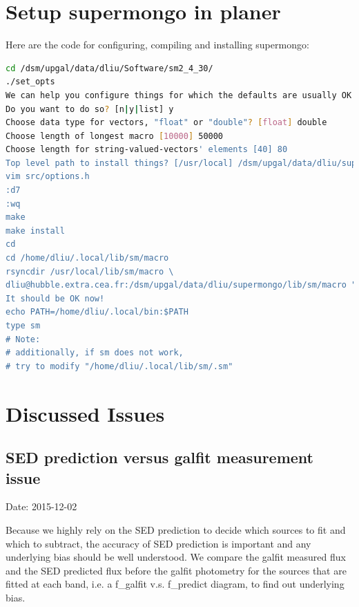 \documentclass[11pt,a4paper]{article}
\begin{document}
\clearpage

\section{Setup supermongo in planer}
\label{Appendix_Supermongo}

Here are the code for configuring, compiling and installing supermongo: 

\begin{lstlisting}[language=bash]
cd /dsm/upgal/data/dliu/Software/sm2_4_30/
./set_opts
We can help you configure things for which the defaults are usually OK
Do you want to do so? [n|y|list] y
Choose data type for vectors, "float" or "double"? [float] double
Choose length of longest macro [10000] 50000
Choose length for string-valued-vectors' elements [40] 80
Top level path to install things? [/usr/local] /dsm/upgal/data/dliu/supermongo
vim src/options.h
:d7
:wq
make
make install
cd
cd /home/dliu/.local/lib/sm/macro
rsyncdir /usr/local/lib/sm/macro \
dliu@hubble.extra.cea.fr:/dsm/upgal/data/dliu/supermongo/lib/sm/macro "*.sm"
It should be OK now!
echo PATH=/home/dliu/.local/bin:$PATH
type sm
# Note:
# additionally, if sm does not work, 
# try to modify "/home/dliu/.local/lib/sm/.sm"
\end{lstlisting}


\clearpage

\section{Discussed Issues}
\label{Appendix_DiscussedIssues}

\subsection{SED prediction versus galfit measurement issue}

\textcolor{green!90!black!60!orange}{Date: 2015-12-02}

Because we highly rely on the SED prediction to decide which sources to fit and which to subtract, the accuracy of SED prediction is important and any underlying bias should be well understood. We compare the galfit measured flux and the SED predicted flux before the galfit photometry for the sources that are fitted at each band, i.e. a f\_galfit v.s. f\_predict diagram, to find out underlying bias. 
\end{document}
